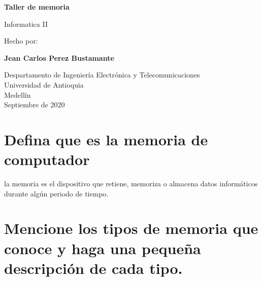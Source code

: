 \documentclass{article}
\begin{document}
\begin{titlepage}
    \begin{center}
        \vspace*{1cm}
            
        \Huge
        \textbf{Taller de memoria}
            
        \vspace{0.5cm}
        \LARGE
            Informatica II
            
            
            Hecho por:
            
        \vspace{1.5cm}
            
        \textbf{Jean Carlos Perez Bustamante}
            
        \vfill
            
        \vspace{0.8cm}
            
        \Large
        Despartamento de Ingeniería Electrónica y Telecomunicaciones\\
        Universidad de Antioquia\\
        Medellín\\
        Septiembre de 2020
            
    \end{center}
\end{titlepage}



\section{Defina que es la memoria de computador}
la memoria es el dispositivo que retiene, memoriza o almacena datos informáticos durante algún periodo de tiempo.

\section{ Mencione los tipos de memoria que conoce y haga una pequeña descripción de cada tipo.}
\end{document}
